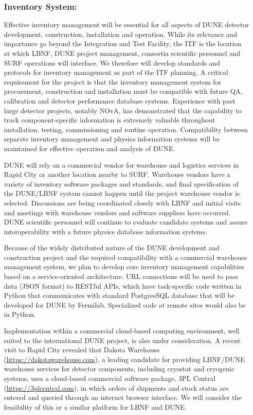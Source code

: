 \subsubsection{Inventory System:}
Effective inventory management will be essential for all aspects of
DUNE detector development, construction, installation and operation.
While its relevance and importance go beyond the Integration and Test
Facility, the ITF is the location at which LBNF, DUNE project
management, consortia scientific personnel and SURF operations will
interface.  We therefore will develop standards and protocols for
inventory management as part of the ITF planning.  A critical
requirement for the project is that the inventory management system
for procurement, construction and installation must be compatible with
future QA, calibration and detector performance database systems.
Experience with past large detector projects, notably NOvA, has
demonstrated that the capability to track component-specific
information is extremely valuable throughout installation, testing,
commissioning and routine operation.  Compatibility between separate
inventory management and physics information systems will be
maintained for effective operation and analysis of DUNE.

DUNE will rely on a commercial vendor for warehouse and logistics
services in Rapid City or another location nearby to SURF.  Warehouse
vendors have a variety of inventory software packages and standards,
and final specification of the DUNE/LBNF system cannot happen until
the project warehouse vendor is selected.  Discussions are being
coordinated closely with LBNF and initial visits and meetings with
warehouse vendors and software suppliers have occurred.  DUNE
scientific personnel will continue to evaluate candidate systems and
assure interoperability with a future physics database
information systems.

Because of the widely distributed nature of the DUNE development and
construction project and the required compatibility with a commercial
warehouse management system, we plan to develop core inventory
management capabilities based on a service-oriented architecture.  URL
connections will be used to pass data (JSON format) to RESTful APIs,
which have task-specific code written in Python that communicates with
standard PostgresSQL database that will be developed for DUNE by
Fermilab.  Specialized code at remote sites would also be in Python.

Implementation within a commercial cloud-based computing environment,
well suited to the international DUNE project, is also under
consideration.  A recent visit to Rapid City revealed that Dakota
Warehouse
(\href{https://dakotawarehouse.com}{https://dakotawarehouse.com}), a
leading candidate for providing LBNF/DUNE warehouse services for
detector components, including cryostat and cryogenic systems, uses a
cloud-based commercial software package, 3PL Central
(\href{https://3plcentral.com}{https://3plcentral.com}), in which
orders of shipments and stock status are entered and queried through
an internet browser interface.  We will consider the feasibility of
this or a similar platform for LBNF and DUNE.
